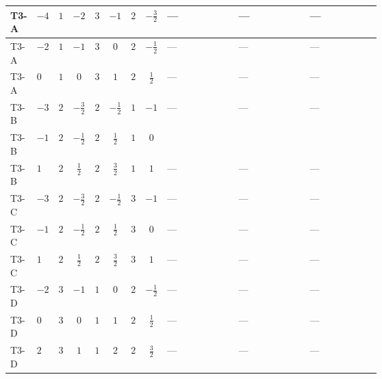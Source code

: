 \documentclass[8pt]{article}
\begin{document}
\begin{landscape}
\begin{longtable}{@{}llcccccc >{\raggedright\arraybackslash}p{0.21\linewidth} >{\raggedright\arraybackslash}p{0.21\linewidth} >{\raggedright\arraybackslash}p{0.21\linewidth}@{}}
\endhead
T3-A & $-4$ & $1$ & $-2$ & $3$ & $-1$ & $2$ & $-\frac{3}{2}$ & --- & --- & --- \\
\midrule
T3-A & $-2$ & $1$ & $-1$ & $3$ & $0$ & $2$ & $-\frac{1}{2}$ & --- & --- & --- \\
\midrule
T3-A & $0$ & $1$ & $0$ & $3$ & $1$ & $2$ & $\frac{1}{2}$ & --- & --- & --- \\
\midrule
T3-B & $-3$ & $2$ & $-\frac{3}{2}$ & $2$ & $-\frac{1}{2}$ & $1$ & $-1$ & --- & --- & --- \\
\midrule
T3-B & $-1$ & $2$ & $-\frac{1}{2}$ & $2$ & $\frac{1}{2}$ & $1$ & $0$ & \scriptsize\adjustbox{max width=\linewidth}{$\begin{gathered} +{\lambda_{10}} \left(\frac{2}{3} \operatorname{Tr}\!\left({y_1}\,\left({y_2}\right)^{\dagger}\right)+\frac{4}{3} (5 \left({\lambda_{10}}\right)^{*}+\left({\lambda_{11}}\right)^{*})\right)\end{gathered}$} & \scriptsize\adjustbox{max width=\linewidth}{$\begin{gathered} +{\lambda_{11}} \left(\frac{2}{3} \operatorname{Tr}\!\left({y_1}\,\left({y_2}\right)^{\dagger}\right)+\frac{4}{3} (\left({\lambda_{10}}\right)^{*}+5 \left({\lambda_{11}}\right)^{*})\right)\end{gathered}$} & \scriptsize\adjustbox{max width=\linewidth}{$\begin{gathered} +\frac{2}{3} (\left({\lambda_{10}}\right)^{*}+\left({\lambda_{11}}\right)^{*}) \operatorname{Tr}\!\left({y_2}\,\left({y_1}\right)^{\dagger}\right)\end{gathered}$} \\
\midrule
T3-B & $1$ & $2$ & $\frac{1}{2}$ & $2$ & $\frac{3}{2}$ & $1$ & $1$ & --- & --- & --- \\
\midrule
T3-C & $-3$ & $2$ & $-\frac{3}{2}$ & $2$ & $-\frac{1}{2}$ & $3$ & $-1$ & --- & --- & --- \\
\midrule
T3-C & $-1$ & $2$ & $-\frac{1}{2}$ & $2$ & $\frac{1}{2}$ & $3$ & $0$ & --- & --- & --- \\
\midrule
T3-C & $1$ & $2$ & $\frac{1}{2}$ & $2$ & $\frac{3}{2}$ & $3$ & $1$ & --- & --- & --- \\
\midrule
T3-D & $-2$ & $3$ & $-1$ & $1$ & $0$ & $2$ & $-\frac{1}{2}$ & --- & --- & --- \\
\midrule
T3-D & $0$ & $3$ & $0$ & $1$ & $1$ & $2$ & $\frac{1}{2}$ & --- & --- & --- \\
\midrule
T3-D & $2$ & $3$ & $1$ & $1$ & $2$ & $2$ & $\frac{3}{2}$ & --- & --- & --- \\
\midrule

\end{longtable}
\end{landscape}
\end{document}
